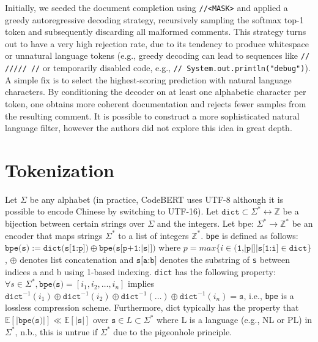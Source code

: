\documentclass[usenames,dvipsnames]{article} %
\begin{document}
  Initially, we seeded the document completion using \lstinline|//<MASK>| and applied a greedy autoregressive decoding strategy, recursively sampling the softmax top-1 token and subsequently discarding all malformed comments. This strategy turns out to have a very high rejection rate, due to its tendency to produce whitespace or unnatural language tokens (e.g., greedy decoding can lead to sequences like \lstinline|// ///// //| or temporarily disabled code, e.g., \lstinline|// System.out.println("debug")|). A simple fix is to select the highest-scoring prediction with natural language characters. By conditioning the decoder on at least one alphabetic character per token, one obtains more coherent documentation and rejects fewer samples from the resulting comment. It is possible to construct a more sophisticated natural language filter, however the authors did not explore this idea in great depth.

\section{Tokenization}

  Let $\Sigma$ be any alphabet (in practice, CodeBERT uses UTF-8 although it is possible to encode Chinese by switching to UTF-16).
  Let $\texttt{dict} \subset \Sigma^*\leftrightarrow\mathbb Z$ be a bijection between certain strings over $\Sigma$ and the integers.
  Let bpe: $\Sigma^*\rightarrow\mathbb{Z}^*$ be an encoder that maps strings $\Sigma^*$ to a list of integers $\mathbb{Z}^*$.
  \texttt{bpe} is defined as follows: $\texttt{bpe(s)} := \texttt{dict(s[1:p])} \oplus \texttt{bpe(s[p+1:|s|])}$ where $p = max \{ i \in \texttt{(1,|p|]} | \texttt{s[1:i]} \in \texttt{dict} \}$, $\oplus$ denotes list concatenation and $\texttt{s[a:b]}$ denotes the substring of \texttt{s} between indices a and b using 1-based indexing.
  \texttt{dict} has the following property: $\forall s \in \Sigma^*, \texttt{bpe(s)} = [i_1, i_2, \ldots, i_n]$ implies $\texttt{dict}^{-1}(i_1) \oplus \texttt{dict}^{-1}(i_2) \oplus \texttt{dict}^{-1}(\ldots) \oplus \texttt{dict}^{-1}(i_n) = \texttt{s}$, i.e., \texttt{bpe} is a lossless compression scheme.
  Furthermore, dict typically has the property that $\mathbb{E}[|\texttt{bpe(s)}|] \ll \mathbb{E}[|\texttt{s}|]$ over $\texttt{s} \in L \subset \Sigma^*$ where L is a language (e.g., NL or PL) in $\Sigma^*$, n.b., this is untrue if $\Sigma^*$ due to the pigeonhole principle.
\end{document}
